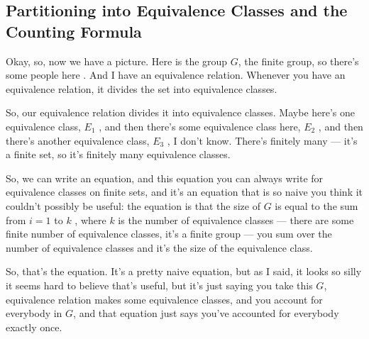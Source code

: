 \subsection{Partitioning into Equivalence Classes and the Counting Formula}

\begin{speech}[00:19:02 - 00:20:33]
Okay, so, now we have a picture. Here is the group $G$, the finite group, so there's some people here . And I have an equivalence relation. Whenever you have an equivalence relation, it divides the set into equivalence classes.

So, our equivalence relation divides it into equivalence classes. Maybe here's one equivalence class, $E_1$ , and then there's some equivalence class here, $E_2$ , and then there's another equivalence class, $E_3$ , I don't know. There's finitely many --- it's a finite set, so it's finitely many equivalence classes.

So, we can write an equation, and this equation you can always write for equivalence classes on finite sets, and it's an equation that is so naive you think it couldn't possibly be useful: the equation is that the size of $G$ is equal to the sum from $i=1$ to $k$ , where $k$ is the number of equivalence classes  --- there are some finite number of equivalence classes, it's a finite group --- you sum over the number of equivalence classes and it's the size of the equivalence class.

So, that's the equation. It's a pretty naive equation, but as I said, it looks so silly it seems hard to believe that's useful, but it's just saying you take this $G$, equivalence relation makes some equivalence classes, and you account for everybody in $G$, and that equation just says you've accounted for everybody exactly once.
\end{speech}

